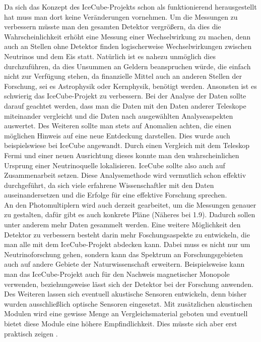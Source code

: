     Da sich das Konzept des IceCube-Projekts schon als funktionierend herausgestellt hat muss man dort 
    keine Veränderungen vornehmen. Um die Messungen zu verbessern müsste man den gesamten Detektor vergrößern, 
    da dies die Wahrscheinlichkeit erhöht eine Messung einer Wechselwirkung zu machen, denn auch an Stellen 
    ohne Detektor finden logischerweise Wechselwirkungen zwischen Neutrinos und dem Eis statt. Natürlich ist 
    es nahezu unmöglich dies durchzuführen, da dies Unsummen an Geldern beanspruchen würde, die einfach nicht 
    zur Verfügung stehen, da finanzielle Mittel auch an anderen Stellen der Forschung, sei es Astrophysik oder 
    Kernphysik, benötigt werden. Ansonsten ist es schwierig das IceCube-Projekt zu verbessern. Bei der Analyse 
    der Daten sollte darauf geachtet werden, dass man die Daten mit den Daten anderer Teleskope miteinander 
    vergleicht und die Daten nach ausgewählten Analyseaspekten auswertet. Des Weiteren sollte man stets auf 
    Anomalien achten, die einen möglichen Hinweis auf eine neue Entdeckung darstellen. Dies wurde auch 
    beispielswiese bei IceCube angewandt. Durch einen Vergleich mit dem Teleskop \grqq Fermi\grqq{} und einer neuen 
    Ausrichtung dieses konnte man den wahrscheinlichen Ursprung einer Neutrinoquelle lokalisieren. IceCube 
    sollte also auch auf Zusammenarbeit setzen. Diese Analysemethode wird vermutlich schon effektiv 
    durchgeführt, da sich viele erfahrene Wissenschaftler mit den Daten auseinandersetzen und die 
    Erfolge für eine effektive Forschung sprechen. \\
    An den Photomultiplern wird auch derzeit gearbeitet, um die Messungen genauer zu gestalten, dafür gibt 
    es auch konkrete Pläne (Näheres bei 1.9). Dadurch sollen unter anderem mehr Daten gesammelt werden. 
    Eine weitere Möglichkeit den Detektor zu verbessern besteht darin mehr Foschungsaspekte zu entwickeln, 
    die man alle mit dem IceCube-Projekt abdecken kann. Dabei muss es nicht nur um Neutrinoforschung gehen, 
    sondern kann das Spektrum an Forschungsgebieten auch auf andere Gebiete der Naturwissenschaft erweitern. 
    Beispielsweise kann man das IceCube-Projekt auch für den Nachweis magnetischer Monopole verwenden, 
    beziehungsweise lässt sich der Detektor bei der Forschung anwenden. Des Weiteren lassen sich eventuell 
    akustische Sensoren entwickeln, denn bisher wurden ausschließlich optische Sensoren eingesetzt. Mit 
    zusätzlichen akustischen Modulen wird eine gewisse Menge an Vergleichsmaterial geboten und eventuell 
    bietet diese Module eine höhere Empfindlichkeit. Dies müsste sich aber erst praktisch zeigen \cite{DaAn18}.

